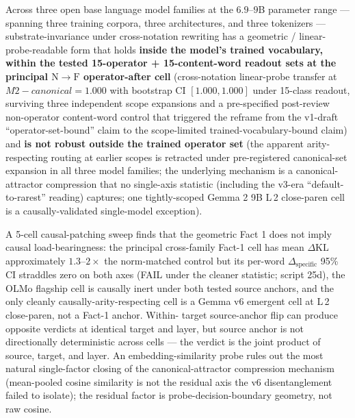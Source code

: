 \documentclass[11pt,letterpaper]{article}
\newcommand{\dkl}{\ensuremath{\Delta\mathrm{KL}}}
\newcommand{\dspec}{\ensuremath{\Delta_{\text{specific}}}}
\newcommand{\NtoF}{\ensuremath{\mathrm{N}\!\to\!\mathrm{F}}}
\newcommand{\Mc}{M2-canonical}
\begin{document}
Across three open base language model families at the $6.9$--$9$B
parameter range --- spanning three training corpora, three
architectures, and three tokenizers --- substrate-invariance under
cross-notation rewriting has a geometric / linear-probe-readable form
that holds \textbf{inside the model's trained vocabulary, within the
tested 15-operator + 15-content-word readout sets at the principal
\NtoF{} operator-after cell} (cross-notation linear-probe transfer
at $\Mc = 1.000$ with bootstrap CI $[1.000, 1.000]$ under 15-class
readout, surviving three independent scope expansions and a
pre-specified post-review non-operator content-word control that
triggered the reframe from the v1-draft ``operator-set-bound'' claim
to the scope-limited trained-vocabulary-bound claim) and \textbf{is
not robust outside the trained operator set} (the apparent
arity-respecting routing at earlier scopes is retracted under
pre-registered canonical-set expansion in all three model families;
the underlying mechanism is a canonical-attractor compression that
no single-axis statistic (including the v3-era ``default-to-rarest''
reading) captures; one tightly-scoped Gemma 2 9B L\,2 close-paren
cell is a causally-validated single-model exception).

A 5-cell causal-patching sweep finds that the geometric Fact 1 does
not imply causal load-bearingness: the principal cross-family Fact-1
cell has mean \dkl{} approximately $1.3$--$2\times$ the norm-matched
control but its per-word \dspec{} 95\% CI straddles zero on both
axes (FAIL under the cleaner statistic; script 25d), the OLMo
flagship cell is causally inert under both tested source anchors,
and the only cleanly causally-arity-respecting cell is a Gemma v6
emergent cell at L\,2 close-paren, not a Fact-1 anchor. Within-
target source-anchor flip can produce opposite verdicts at identical
target and layer, but source anchor is not directionally
deterministic across cells --- the verdict is the joint product of
source, target, and layer. An embedding-similarity probe rules out
the most natural single-factor closing of the canonical-attractor
compression mechanism (mean-pooled cosine similarity is not the
residual axis the v6 disentanglement failed to isolate); the
residual factor is probe-decision-boundary geometry, not raw
cosine.
\end{document}
